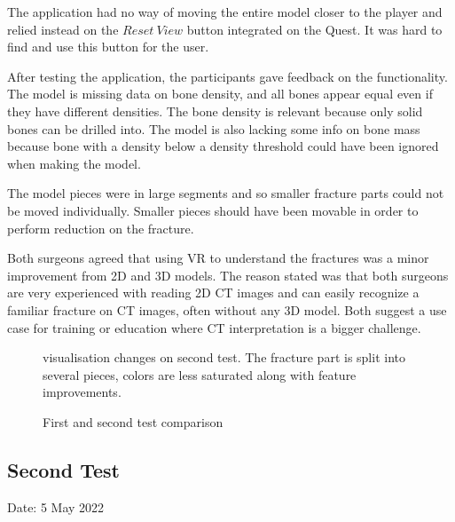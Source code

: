 \documentclass[a4paper]{report}
\begin{document}
The application had no way of moving the entire model closer to the player and relied instead on the $Reset\ View$ button integrated on the Quest. It was hard to find and use this button for the user.

After testing the application, the participants gave feedback on the functionality.
The model is missing data on bone density, and all bones appear equal even if they have different densities. The bone density is relevant because only solid bones can be drilled into. The model is also lacking some info on bone mass because bone with a density below a density threshold could have been ignored when making the model.

The model pieces were in large segments and so smaller fracture parts could not be moved individually. Smaller pieces should have been movable in order to perform reduction on the fracture.

Both surgeons agreed that using VR to understand the fractures was a minor improvement from 2D and 3D models.
The reason stated was that both surgeons are very experienced with reading 2D CT images and can easily recognize a familiar fracture on CT images, often without any 3D model. Both suggest a use case for training or education where CT interpretation is a bigger challenge.


\begin{figure}[h!]
    \centering
	\hfill
	\caption{First and second test comparison}\label{test}
  \small
  visualisation changes on second test. The fracture part is split into several pieces, colors are less saturated along with feature improvements.
\end{figure}

\subsection{Second Test}
Date: 5 May 2022
\end{document}
